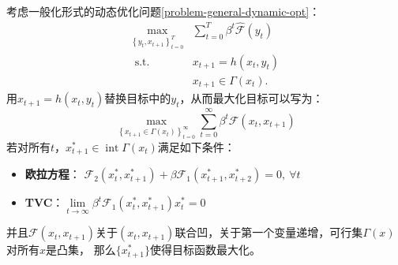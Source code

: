 \begin{property}    \label{property-dynamic-opt-general}
    考虑一般化形式的动态优化问题\cref{problem-general-dynamic-opt}：
    \begin{equation*}
        \begin{aligned}
            \max _{\left\{y_t,x_{t+1}\right\}_{t=0}^T} & \sum_{t=0}^T\beta^t\hat{\mathcal{F}}\left(y_t\right) \\
            \text { s.t. } & x_{t+1}=h\left(x_t, y_t\right) \\
            & x_{t+1} \in \Gamma\left(x_t\right) .
        \end{aligned}
    \end{equation*}
    用$x_{t+1} = h(x_t,y_t)$替换目标中的$y_t$，从而最大化目标可以写为：
    \begin{equation*}
        \max _{\left\{x_{t+1} \in \Gamma\left(x_t\right)\right\}_{t=0}^{\infty}}
            \sum_{t=0}^{\infty} \beta^t \mathcal{F}\left(x_t, x_{t+1}\right)
    \end{equation*}
    若对所有$t$，$x_{t+1}^* \in \operatorname{int} \Gamma\left(x_t\right)$满足如下条件：
    \begin{itemize}
        \item \textbf{欧拉方程}：
            $\mathcal{F}_2\left(x_t^*,x_{t+1}^*\right)+\beta\mathcal{F}_1\left(x_{t+1}^*,x_{t+2}^*\right)=0,~\forall t$
        \item \textbf{TVC}：$\lim\limits_{t\rightarrow\infty}\beta^t \mathcal{F}_1\left(x_t^*,x_{t+1}^*\right) x_t^*=0$
    \end{itemize}
    并且$\mathcal{F}(x_t,x_{t+1})$关于$(x_t,x_{t+1})$联合凹，关于第一个变量递增，可行集$\Gamma(x)$对所有$x$是凸集，
    那么$\{x_{t+1}^*\}$使得目标函数最大化。
\end{property}

